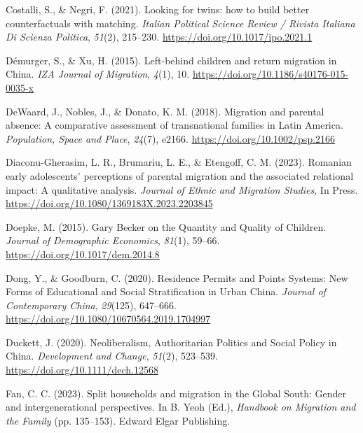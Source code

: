 \documentclass[
  man]{apa7}
\newlength{\cslhangindent}
\newlength{\cslentryspacingunit} %
\newenvironment{CSLReferences}[2] %
 {%
  \setlength{\parindent}{0pt}
  \ifodd #1
  \let\oldpar\par
  \def\par{\hangindent=\cslhangindent\oldpar}
  \fi
  \setlength{\parskip}{#2\cslentryspacingunit}
 }%
 {}
\begin{document}
\begin{CSLReferences}{1}{0}
\leavevmode{}%
Costalli, S., \& Negri, F. (2021). Looking for twins: how to build better counterfactuals with matching. \emph{Italian Political Science Review / Rivista Italiana Di Scienza Politica}, \emph{51}(2), 215--230. \url{https://doi.org/10.1017/ipo.2021.1}

\leavevmode{}%
Démurger, S., \& Xu, H. (2015). Left-behind children and return migration in {China}. \emph{IZA Journal of Migration}, \emph{4}(1), 10. \url{https://doi.org/10.1186/s40176-015-0035-x}

\leavevmode{}%
DeWaard, J., Nobles, J., \& Donato, K. M. (2018). Migration and parental absence: A comparative assessment of transnational families in Latin America. \emph{Population, Space and Place}, \emph{24}(7), e2166. \url{https://doi.org/10.1002/psp.2166}

\leavevmode{}%
Diaconu-Gherasim, L. R., Brumariu, L. E., \& Etengoff, C. M. (2023). Romanian early adolescents{'} perceptions of parental migration and the associated relational impact: A qualitative analysis. \emph{Journal of Ethnic and Migration Studies}, In Press. \url{https://doi.org/10.1080/1369183X.2023.2203845}

\leavevmode{}%
Doepke, M. (2015). Gary Becker on the Quantity and Quality of Children. \emph{Journal of Demographic Economics}, \emph{81}(1), 59--66. \url{https://doi.org/10.1017/dem.2014.8}

\leavevmode{}%
Dong, Y., \& Goodburn, C. (2020). Residence Permits and Points Systems: New Forms of Educational and Social Stratification in Urban {China}. \emph{Journal of Contemporary {China}}, \emph{29}(125), 647--666. \url{https://doi.org/10.1080/10670564.2019.1704997}

\leavevmode{}%
Duckett, J. (2020). Neoliberalism, Authoritarian Politics and Social Policy in {China}. \emph{Development and Change}, \emph{51}(2), 523--539. \url{https://doi.org/10.1111/dech.12568}

\leavevmode{}%
Fan, C. C. (2023). Split households and migration in the {Global South}: Gender and intergenerational perspectives. In B. Yeoh (Ed.), \emph{Handbook on {Migration} and the {Family}} (pp. 135--153). {Edward Elgar Publishing}.


\end{CSLReferences}
\end{document}
